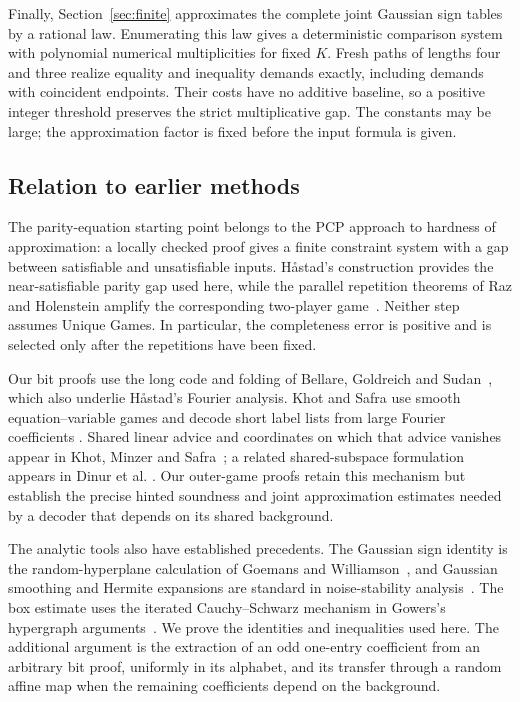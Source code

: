 Finally, Section~\ref{sec:finite} approximates the complete joint Gaussian
sign tables by a rational law. Enumerating this law gives a deterministic
comparison system with polynomial numerical multiplicities for fixed $K$.
Fresh paths of lengths four and three realize equality and inequality
demands exactly, including demands with coincident endpoints. Their costs
have no additive baseline, so a positive integer threshold preserves the
strict multiplicative gap. The constants may be large; the approximation
factor is fixed before the input formula is given.

\subsection{Relation to earlier methods}

The parity-equation starting point belongs to the PCP approach to hardness
of approximation: a locally checked proof gives a finite constraint system
with a gap between satisfiable and unsatisfiable inputs. H\aa stad's
construction provides the near-satisfiable parity gap used here, while the
parallel repetition theorems of Raz and Holenstein amplify the
corresponding two-player game~\cite{Hastad2001,Raz1998,Holenstein2009}.
Neither step assumes Unique Games. In particular, the completeness error
is positive and is selected only after the repetitions have been fixed.

Our bit proofs use the long code and folding of Bellare, Goldreich and
Sudan~\cite{BGS1998}, which also underlie H\aa stad's Fourier analysis.
Khot and Safra use smooth equation--variable games and decode short label
lists from large Fourier coefficients
\cite[Sections~3.2--3.4 and~5.2]{KS13}.
Shared linear advice and coordinates on which that advice vanishes appear
in Khot, Minzer and Safra~\cite[Sections~3.3--3.4]{KMS17}; a related
shared-subspace formulation appears in Dinur et al.
\cite[Lemma~5.4]{DKKMS2025}.
Our outer-game proofs retain this mechanism but establish the precise
hinted soundness and joint approximation estimates needed by a decoder
that depends on its shared background.

The analytic tools also have established precedents. The Gaussian sign
identity is the random-hyperplane calculation of Goemans and
Williamson~\cite{GW95}, and Gaussian smoothing and Hermite expansions
are standard in noise-stability analysis~\cite{MOO10}. The box estimate
uses the iterated Cauchy--Schwarz mechanism in Gowers's hypergraph
arguments~\cite{Gowers2007}. We prove the identities and inequalities
used here. The additional argument is the extraction of an odd one-entry
coefficient from an arbitrary bit proof, uniformly in its alphabet,
and its transfer through a random affine map when the remaining
coefficients depend on the background.

